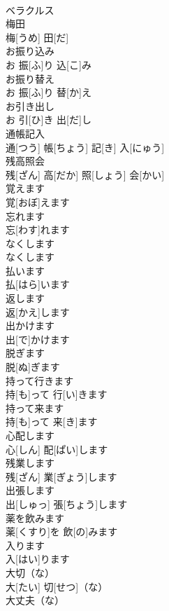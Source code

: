 \documentclass[8pt]{extreport}
\begin{document}
\begin{CJK}{UTF8}{min}
\\	ベラクルス		
\\	梅田	
\\	梅[うめ] 田[だ]		
\\	お振り込み	
\\	お 振[ふ]り 込[こ]み		
\\	お振り替え	
\\	お 振[ふ]り 替[か]え		
\\	お引き出し	
\\	お 引[ひ]き 出[だ]し		
\\	通帳記入	
\\	通[つう] 帳[ちょう] 記[き] 入[にゅう]		
\\	残高照会	
\\	残[ざん] 高[だか] 照[しょう] 会[かい]		
\\	覚えます	
\\	覚[おぼ]えます		
\\	忘れます	
\\	忘[わす]れます		
\\	なくします	
\\	なくします		
\\	払います	
\\	払[はら]います		
\\	返します	
\\	返[かえ]します		
\\	出かけます	
\\	出[で]かけます		
\\	脱ぎます	
\\	脱[ぬ]ぎます		
\\	持って行きます	
\\	持[も]って 行[い]きます		
\\	持って来ます	
\\	持[も]って 来[き]ます		
\\	心配します	
\\	心[しん] 配[ぱい]します		
\\	残業します	
\\	残[ざん] 業[ぎょう]します		
\\	出張します	
\\	出[しゅっ] 張[ちょう]します		
\\	薬を飲みます	
\\	薬[くすり]を 飲[の]みます		
\\	入ります	
\\	入[はい]ります		
\\	大切（な）	
\\	大[たい] 切[せつ]（な）		
\\	大丈夫（な）	

\end{CJK}
\end{document}
